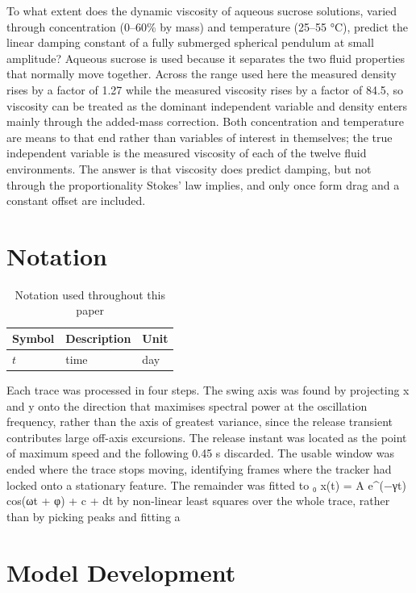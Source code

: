 \documentclass[12pt,letterpaper]{article}
\begin{document}
To what extent does the dynamic viscosity of aqueous sucrose solutions, varied through concentration (0–60\% by mass) and temperature (25–55 °C), predict the linear damping constant of a fully submerged spherical pendulum at small amplitude? Aqueous sucrose is used because it separates the two fluid properties that normally move together. Across the range used here the measured density rises by a factor of 1.27 while the measured viscosity rises by a factor of 84.5, so viscosity can be treated as the dominant independent variable and density enters mainly through the added-mass correction. Both concentration and temperature are means to that end rather than variables of interest in themselves; the true independent variable is the measured viscosity of each of the twelve fluid environments. The answer is that viscosity does predict damping, but not through the proportionality Stokes' law implies, and only once form drag and a constant offset are included.

\section{Notation}

\begin{table}[htbp]
\centering
\begin{tabular}{lll}
\toprule
Symbol & Description & Unit \\
\midrule
$t$ & time & day \\
\bottomrule
\end{tabular}
\caption{Notation used throughout this paper}\label{tbl:notation}
\end{table}

Each trace was processed in four steps. The swing axis was found by projecting x and y onto the direction that maximises spectral power at the oscillation frequency, rather than the axis of greatest variance, since the release transient contributes large off-axis excursions. The release instant was located as the point of maximum speed and the following 0.45 s discarded. The usable window was ended where the trace stops moving, identifying frames where the tracker had locked onto a stationary feature. The remainder was fitted to ₀ x(t) = A e\textasciicircum{}(−γt) cos(ωt + φ) + c + dt by non-linear least squares over the whole trace, rather than by picking peaks and fitting a

\section{Model Development}
\end{document}
